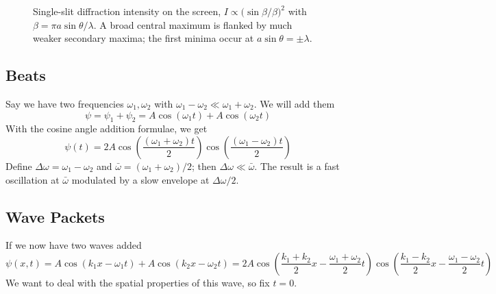 \documentclass{report}
\numberwithin{equation}{section}
\begin{document}
\begin{figure}[H]
\centering
{}
\caption{Single-slit diffraction intensity on the screen, $I \propto
\big(\sin\beta / \beta\big)^2$ with $\beta = \pi a\sin\theta/\lambda$. A broad
central maximum is flanked by much weaker secondary maxima; the first minima
occur at $a\sin\theta = \pm\lambda$.}
\label{fig:single_slit}
\end{figure}
\subsection{Beats}
Say we have two frequencies $\omega_1, \omega_2$ with $\omega_1 - \omega_2 \ll \omega_1 + \omega_2$. We will add them
\begin{equation}
	\psi = \psi_1 + \psi_2 = A\cos(\omega_1 t) + A\cos(\omega_2 t)
\end{equation}
With the cosine angle addition formulae, we get
\begin{equation}
	\psi(t) = 2A\cos\left(\frac{(\omega_1 + \omega_2)t}{2}\right)\cos\left(\frac{(\omega_1 - \omega_2)t}{2}\right)
\end{equation}
Define $\Delta\omega = \omega_1 - \omega_2$ and $\bar{\omega} = (\omega_1 + \omega_2)/2$; then $\Delta \omega \ll \bar{\omega}$. The result is a fast oscillation at $\bar\omega$ modulated by a slow envelope at $\Delta\omega/2$.
\subsection{Wave Packets}
If we now have two waves added
\begin{equation}
    \psi(x,t) = A\cos(k_1 x-\omega_1 t) + A\cos(k_2 x - \omega_2 t) = 2A\cos\left(\frac{k_1 + k_2}{2}x - \frac{\omega_1 + \omega_2}{2}t\right)\cos\left(\frac{k_1-k_2}{2}x-\frac{\omega_1 - \omega_2}{2}t\right)
\end{equation}
We want to deal with the spatial properties of this wave, so fix $t=0$.
\end{document}
